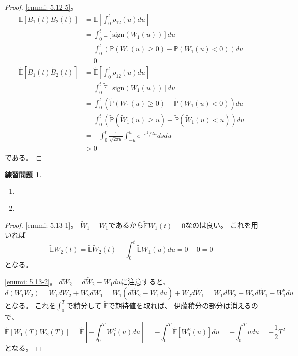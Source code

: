\documentclass[uplatex]{jsarticle}
\theoremstyle{definition}
\newtheorem{prob}[prob]{練習問題}
\def\P{\mathbb{P}}
\def\E{\mathbb{E}}
\begin{document}
\begin{proof}
  \ref{enumi: 5.12-5}。
  \begin{align*}
    \E\left[B_1(t)B_2(t)\right]
    &= \E\left[\int_0^t\rho_{12}(u)du\right] \\
    &= \int_0^t\E\left[\mathrm{sign}\left( W_1(u) \right)\right] du \\
    &= \int_0^t\left( \P(W_1(u)\geq 0) - \P(W_1(u)<0)\right) du \\
    &= 0 \\
    \tilde{\E}\left[\tilde{B}_1(t)\tilde{B}_2(t)\right]
    &= \tilde{\E}\left[\int_0^t\rho_{12}(u)du\right] \\
    &= \int_0^t\tilde{\E}
    \left[\mathrm{sign}\left( W_1(u) \right)\right] du \\
    &= \int_0^t\left(
    \tilde{\P}(W_1(u)\geq 0) - \tilde{\P}(W_1(u)<0)\right) du \\
    &= \int_0^t\left(
    \tilde{\P}(\tilde{W}_1(u)\geq u)
    - \tilde{\P}(\tilde{W}_1(u) < u)\right) du \\
    &= - \int_0^t \frac{1}{\sqrt{2\pi u}}\int_{-u}^ue^{-s^2/2u}dsdu \\
    &> 0
  \end{align*}
  である。
\end{proof}


\begin{prob}\label{prob: 5.13}
  \begin{enumerate}
    \item \label{enumi: 5.13-1}
    \item \label{enumi: 5.13-2}
  \end{enumerate}
\end{prob}

\begin{proof}
  \ref{enumi: 5.13-1}。
  \(\tilde{W}_1=W_1\)であるから\(\tilde{\E}W_1(t) = 0\)なのは良い。
  これを用いれば
  \[
  \tilde{\E}W_2(t) = \tilde{\E}\tilde{W}_2(t)
  - \int_0^t\tilde{\E}W_1(u)du = 0 - 0 = 0
  \]
  となる。

  \ref{enumi: 5.13-2}。
  \(dW_2= d\tilde{W}_2 - W_1du\)に注意すると、
  \[
  d(W_1W_2) = W_1dW_2 + W_2dW_1
  = W_1 (d\tilde{W}_2 - W_1du) + W_2 d\tilde{W}_1
  = W_1 d\tilde{W}_2 + W_2d\tilde{W}_1 - W_1^2du
  \]
  となる。
  これを\(\int_0^T\)で積分して
  \(\tilde{\E}\)で期待値を取れば、
  伊藤積分の部分は消えるので、
  \[
  \tilde{\E}[W_1(T)W_2(T)]
  = \tilde{\E}\left[ -\int_0^TW_1^2(u)du\right]
  = -\int_0^T\tilde{\E}\left[ W_1^2(u)\right] du
  = -\int_0^Tu du
  = -\frac{1}{2}T^2
  \]
  となる。
\end{proof}
\end{document}
